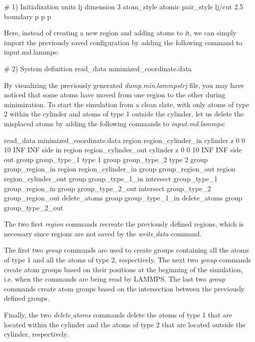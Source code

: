 \begin{lcverbatim}
# 1) Initialization
units lj
dimension 3
atom_style atomic
pair_style lj/cut 2.5
boundary p p p
\end{lcverbatim}

\noindent Here, instead of creating a new region and adding atoms to it, we can simply
import the previously saved configuration by adding the following command
to input.md.lammps:

\begin{lcverbatim}
# 2) System definition
read_data minimized_coordinate.data
\end{lcverbatim}

\noindent By visualizing the previously generated \textit{dump.min.lammpstrj}
file, you may have noticed that some atoms have moved from
one region to the other during minimization.
To start the simulation from a clean slate, with
only atoms of type 2 within the cylinder and atoms of type
1 outside the cylinder, let us delete the misplaced atoms
by adding the following commands to \textit{input.md.lammps}:

\begin{lcverbatim}
read_data minimized_coordinate.data
region region_cylinder_in cylinder z 0 0 10 INF INF side in
region region_cylinder_out cylinder z 0 0 10 INF INF side out
group group_type_1 type 1
group group_type_2 type 2
group group_region_in region region_cylinder_in
group group_region_out region region_cylinder_out
group group_type_1_in intersect group_type_1 group_region_in
group group_type_2_out intersect group_type_2 group_region_out
delete_atoms group group_type_1_in
delete_atoms group group_type_2_out
\end{lcverbatim}

\noindent The two first \textit{region} commands recreate
the previously defined regions, which is necessary since
regions are not saved by the \textit{write$\_$data} command.

\vspace{0.25cm} \noindent The first two \textit{group} commands are used to create groups containing
all the atoms of type 1 and all the atoms of type 2, respectively.
The next two \textit{group} commands create atom groups based on their
positions at the beginning of the simulation, i.e. when the commands
are being read by LAMMPS.
The last two \textit{group} commands create atom groups based on the intersection
between the previously defined groups.

\vspace{0.25cm} \noindent Finally, the two \textit{delete$\_$atoms} commands delete the
atoms of type 1 that are located within the cylinder and the atoms of
type 2 that are located outside the cylinder, respectively. 

